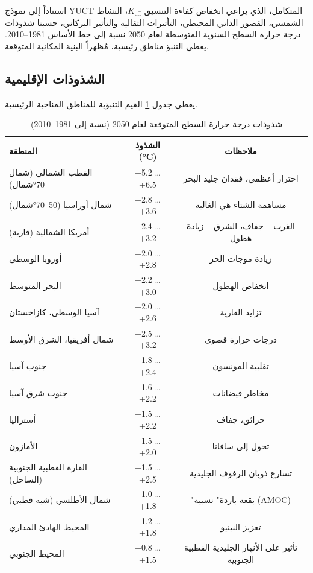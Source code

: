 \documentclass[11pt,a4paper]{article}
\begin{document}
	استناداً إلى نموذج YUCT المتكامل، الذي يراعي انخفاض كفاءة التنسيق \(K_{\mathrm{eff}}\)، النشاط الشمسي، القصور الذاتي المحيطي، التأثيرات الثقالية والتأثير البركاني، حسبنا شذوذات درجة حرارة السطح السنوية المتوسطة لعام 2050 نسبة إلى خط الأساس 1981–2010. يغطي التنبؤ مناطق رئيسية، مُظهراً البنية المكانية المتوقعة.
	
	\subsection{الشذوذات الإقليمية}
	
	يعطي جدول \ref{tab:anomalies_2050} القيم التنبؤية للمناطق المناخية الرئيسية.
	
	\begin{table}[htbp]
		\centering
		\caption{شذوذات درجة حرارة السطح المتوقعة لعام 2050 (نسبة إلى 1981–2010)}
		\label{tab:anomalies_2050}
		\small
		\begin{tabular}{p{4.5cm} c c}
			\toprule
			المنطقة & الشذوذ (°C) & ملاحظات \\
			\midrule
			القطب الشمالي (شمال 70°شمال) & +5.2 … +6.5 & احترار أعظمي، فقدان جليد البحر \\
			شمال أوراسيا (50–70°شمال) & +2.8 … +3.6 & مساهمة الشتاء هي الغالبة \\
			أمريكا الشمالية (قارية) & +2.4 … +3.2 & الغرب – جفاف، الشرق – زيادة هطول \\
			أوروبا الوسطى & +2.0 … +2.8 & زيادة موجات الحر \\
			البحر المتوسط & +2.2 … +3.0 & انخفاض الهطول \\
			آسيا الوسطى، كازاخستان & +2.0 … +2.6 & تزايد القارية \\
			شمال أفريقيا، الشرق الأوسط & +2.5 … +3.2 & درجات حرارة قصوى \\
			جنوب آسيا & +1.8 … +2.4 & تقلبية المونسون \\
			جنوب شرق آسيا & +1.6 … +2.2 & مخاطر فيضانات \\
			أستراليا & +1.5 … +2.2 & حرائق، جفاف \\
			الأمازون & +1.5 … +2.0 & تحول إلى سافانا \\
			القارة القطبية الجنوبية (الساحل) & +1.5 … +2.5 & تسارع ذوبان الرفوف الجليدية \\
			شمال الأطلسي (شبه قطبي) & +1.0 … +1.8 & "بقعة باردة" نسبية (AMOC) \\
			المحيط الهادئ المداري & +1.2 … +1.8 & تعزيز النينيو \\
			المحيط الجنوبي & +0.8 … +1.5 & تأثير على الأنهار الجليدية القطبية الجنوبية \\
			\bottomrule
		\end{tabular}
	\end{table}
	
\end{document}
